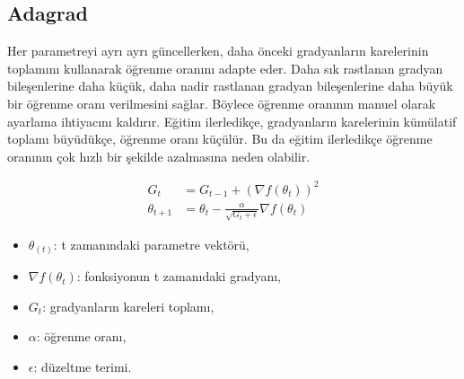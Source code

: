 \newpage

\subsection{Adagrad}
Her parametreyi ayrı ayrı güncellerken, daha önceki gradyanların karelerinin toplamını kullanarak öğrenme oranını adapte eder. Daha sık rastlanan gradyan bileşenlerine daha küçük, daha nadir rastlanan gradyan bileşenlerine daha büyük bir öğrenme oranı verilmesini sağlar. Böylece öğrenme oranının manuel olarak ayarlama ihtiyacını kaldırır. Eğitim ilerledikçe, gradyanların karelerinin kümülatif toplamı büyüdükçe, öğrenme oranı küçülür. Bu da eğitim ilerledikçe öğrenme oranının çok hızlı bir şekilde azalmasına neden olabilir.

\begin{align*}
G_{t} & = G_{t-1} + (\nabla f(\theta_t))^2 \\
\theta_{t+1} & = \theta_t - \frac{\alpha}{\sqrt{G_{t} + \epsilon}} \nabla f(\theta_t)
\end{align*}

\begin{itemize}
	\item $\theta_(t)$: t zamanındaki parametre vektörü,
	\item $\nabla f(\theta_{t})$: fonksiyonun t zamanıdaki gradyanı,
	\item $G_{t}$: gradyanların kareleri toplamı,
	\item $\alpha$: öğrenme oranı,
	\item $\epsilon$: düzeltme terimi.
\end{itemize}

\newpage
